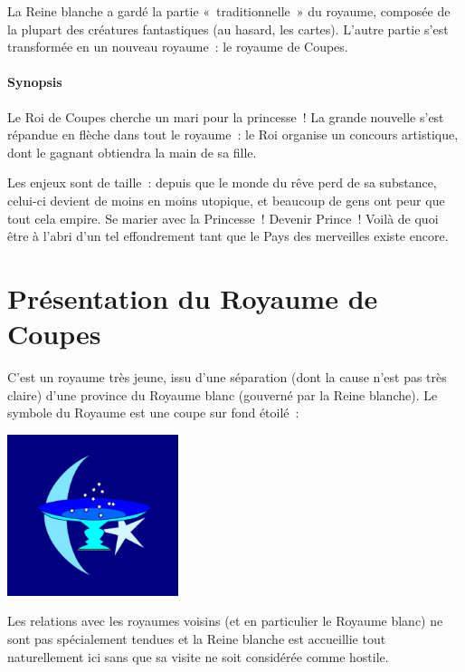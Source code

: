 La Reine blanche a gardé la partie «~traditionnelle~» du royaume, composée de la plupart des créatures fantastiques (au hasard, les cartes).
L’autre partie s’est transformée en un nouveau royaume~:  le royaume de Coupes.

\paragraph{Synopsis}
{
Le Roi de Coupes cherche un mari pour la princesse~!
La grande nouvelle s’est répandue en flèche dans tout le royaume~:  le Roi organise un concours artistique, dont le gagnant obtiendra la main de sa fille.

Les enjeux sont de taille~:  depuis que le monde du rêve perd de sa substance, celui-ci devient de moins en moins utopique, et beaucoup de gens ont peur que tout cela empire.
Se marier avec la Princesse~!  Devenir Prince~!
Voilà de quoi être à l’abri d’un tel effondrement tant que le Pays des merveilles existe encore.
}

\section{Présentation du Royaume de Coupes}


C’est un royaume très jeune, issu d’une séparation (dont la cause n’est pas très claire) d’une province du Royaume blanc (gouverné par la Reine blanche).
Le symbole du Royaume est une coupe sur fond étoilé~:
\begin{center}
\includegraphics[width=5cm]{images/Royaume_de_Coupes_logo.png}
\end{center}

Les relations avec les royaumes voisins (et en particulier le Royaume blanc) ne sont pas spécialement tendues et la Reine blanche est accueillie tout naturellement ici sans que sa visite ne soit considérée comme hostile.

